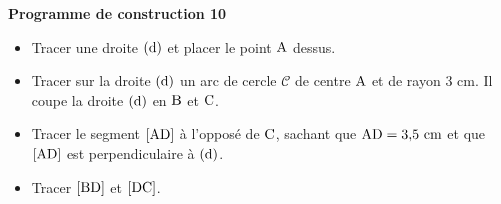 \documentclass[exercice,a4]{thedocument}%
\begin{document}
%
\noindent\textbf{Programme de construction 10}\par\smallskip\noindent
\begin{itemize}
    \item Tracer une droite $(\text{d})$ et placer le point
    $\text{A}$ dessus.
    \item Tracer sur la droite $(\text{d})$ un arc de cercle
    $\mathcal{C}$ de centre $\text{A}$ et de rayon $3\text{ cm}$. Il
    coupe la droite $(\text{d})$ en $\text{B}$ et
    $\text{C}$.
    \item Tracer le segment $[\text{AD}]$ à l'opposé de
    $\text{C}$, sachant que $\text{AD}=3{,}5\text{ cm}$ et que
    $[\text{AD}]$ est perpendiculaire à $(\text{d})$.
    \item Tracer $[\text{BD}]$ et $[\text{DC}]$.
\end{itemize}
\end{document}

